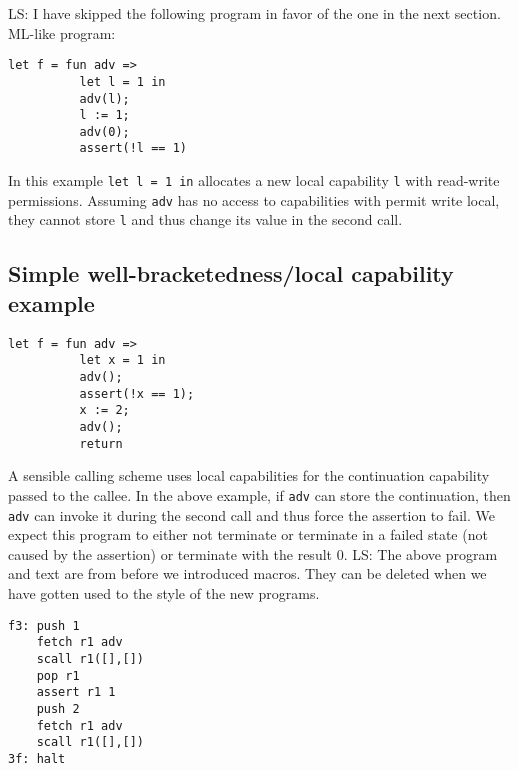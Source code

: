 \documentclass[a4paper]{article}
\newcommand\lau[1]{{\color{purple} \sf \footnotesize {LS: #1}}\\}
\begin{document}
\begin{lemma}

\lau{I have skipped the following program in favor of the one in the next section. }
              ML-like program:
\begin{verbatim}
let f = fun adv =>
          let l = 1 in
          adv(l);
          l := 1;
          adv(0);
          assert(!l == 1)
\end{verbatim}
              In this example \texttt{let l = 1 in} allocates a new local capability \texttt{l} with read-write permissions. Assuming \texttt{adv} has no access to capabilities with permit write local, they cannot store \texttt{l} and thus change its value in the second call.

\subsection{Simple well-bracketedness/local capability example}
\begin{verbatim}
let f = fun adv =>
          let x = 1 in
          adv();
          assert(!x == 1);
          x := 2;
          adv();
          return
\end{verbatim}
              A sensible calling scheme uses local capabilities for the continuation capability passed to the callee. In the above example, if \texttt{adv} can store the continuation, then 
              \texttt{adv} can invoke it during the second call and thus force the assertion to fail. We expect this program to either not terminate or terminate in a failed state (not caused by the assertion) or terminate with the result 0.
\lau{The above program and text are from before we introduced macros. They can be deleted when we have gotten used to the style of the new programs. }

\begin{verbatim}
f3: push 1
    fetch r1 adv
    scall r1([],[])
    pop r1
    assert r1 1
    push 2
    fetch r1 adv
    scall r1([],[])
3f: halt
\end{verbatim}


\end{lemma}
\end{document}
